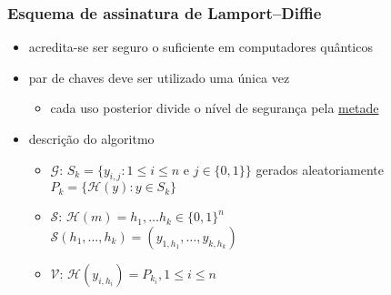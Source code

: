 \documentclass{beamer}
\begin{document}
\begin{frame}
  \frametitle{Esquema de assinatura de Lamport--Diffie \cite{Lamport1979}}
  \begin{itemize}
    \item acredita-se ser seguro o suficiente em computadores quânticos
    \item par de chaves deve ser utilizado uma única vez
    \begin{itemize}
      \item cada uso posterior divide o nível de segurança pela
        \href{https://crypto.stackexchange.com/a/2642}{metade}
    \end{itemize}
    \item descrição do algoritmo
    \begin{itemize}
      \item $\mathcal{G}$: $S_{k} = \{y_{i, j} : 1 \leq i \leq n$ e
        $j \in \{0, 1\}\}$ gerados aleatoriamente \\
        \hspace{1.3em}$P_{k} = \{\mathcal{H}(y) : y \in S_{k}\}$
    \item $\mathcal{S}$: $\mathcal{H}(m)
        = h_{1}, \dots h_{k} \in \{0, 1\}^{n}$ \\
        \hspace{1.3em}$\mathcal{S}(h_{1}, \dots, h_{k})
          = (y_{1, h_{1}}, \dots, y_{k, h_{k}})$
      \item $\mathcal{V}$: $\mathcal{H}(y_{i, h_{i}})
        = P_{k_{i}}, 1 \leq i \leq n$
    \end{itemize}
  \end{itemize}
\end{frame}
\end{document}
